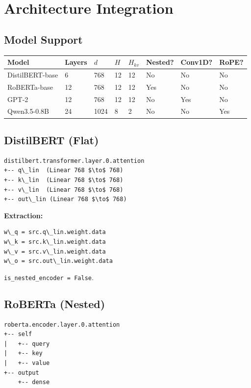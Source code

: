 
\section{Architecture Integration}

\subsection{Model Support}

\begin{table}[H]
\centering
\small
\begin{tabular}{llllllll}
\toprule
\textbf{Model} & \textbf{Layers} & \textbf{$d$} & \textbf{$H$} & \textbf{$H_{kv}$} & \textbf{Nested?} & \textbf{Conv1D?} & \textbf{RoPE?} \\
\midrule
DistilBERT-base & 6 & 768 & 12 & 12 & No & No & No \\
RoBERTa-base & 12 & 768 & 12 & 12 & Yes & No & No \\
GPT-2 & 12 & 768 & 12 & 12 & No & Yes & No \\
Qwen3.5-0.8B & 24 & 1024 & 8 & 2 & No & No & Yes \\
\bottomrule
\end{tabular}
\end{table}

\subsection{DistilBERT (Flat)}

\begin{lstlisting}
distilbert.transformer.layer.0.attention
+-- q\_lin  (Linear 768 $\to$ 768)
+-- k\_lin  (Linear 768 $\to$ 768)
+-- v\_lin  (Linear 768 $\to$ 768)
+-- out\_lin (Linear 768 $\to$ 768)
\end{lstlisting}

\textbf{Extraction:}
\begin{lstlisting}
w\_q = src.q\_lin.weight.data
w\_k = src.k\_lin.weight.data
w\_v = src.v\_lin.weight.data
w\_o = src.out\_lin.weight.data
\end{lstlisting}

\texttt{is\_nested\_encoder = False}.

\subsection{RoBERTa (Nested)}

\begin{lstlisting}
roberta.encoder.layer.0.attention
+-- self
|   +-- query
|   +-- key
|   +-- value
+-- output
    +-- dense
\end{lstlisting}

